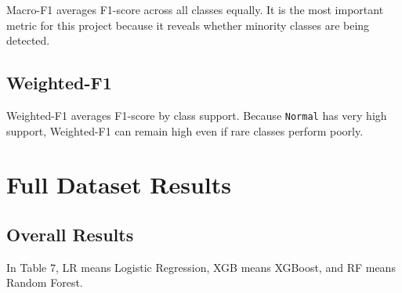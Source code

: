\documentclass[12pt,a4paper]{article}
\begin{document}
Macro-F1 averages F1-score across all classes equally. It is the most important metric for this project because it reveals whether minority classes are being detected.

\subsection{Weighted-F1}

Weighted-F1 averages F1-score by class support. Because \texttt{Normal} has very high support, Weighted-F1 can remain high even if rare classes perform poorly.

\section{Full Dataset Results}

\subsection{Overall Results}

\begin{table}[H]
\centering
\caption{Full-dataset validation and test results.}
\footnotesize
\setlength{\tabcolsep}{4pt}
\end{table}

In Table 7, LR means Logistic Regression, XGB means XGBoost, and RF means Random Forest.
\end{document}
